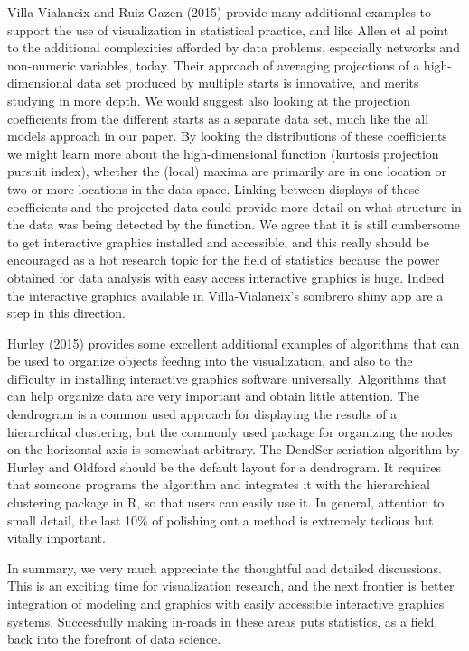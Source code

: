 \documentclass[preprint]{imsart}
\begin{document}
Villa-Vialaneix and Ruiz-Gazen (2015) provide many additional examples to support the use of visualization in statistical practice, and like Allen et al point to the additional complexities afforded by data problems, especially networks and non-numeric variables, today. Their approach of averaging projections of a high-dimensional data set produced by multiple starts is innovative, and merits studying in more depth. We would suggest also looking at the projection coefficients from the different starts as a separate data set, much like the all models approach in our paper. By looking the distributions of these coefficients we might learn more about the high-dimensional function (kurtosis projection pursuit index), whether the (local) maxima are primarily are in one location or two or more locations in the data space. Linking between displays of these coefficients and the projected data could provide more detail on what structure in the data was being detected by the function. We agree that it is still cumbersome to get interactive graphics installed and accessible, and this really should be encouraged as a hot research topic for the field of statistics because the power obtained  for data analysis with easy access interactive graphics is huge. Indeed the interactive graphics available in Villa-Vialaneix's sombrero shiny app are a step in this direction.

Hurley (2015) provides some excellent additional examples of algorithms that can be used to organize objects feeding into the visualization, and also to the difficulty in installing interactive graphics software universally. Algorithms that can help organize data are very important and obtain little attention. The dendrogram is a common used approach for displaying the results of a hierarchical clustering, but the commonly used package for organizing the nodes on the horizontal axis is somewhat arbitrary. The DendSer seriation algorithm by Hurley and Oldford should be the default layout for a dendrogram. It requires that someone programs the algorithm and integrates it with the hierarchical clustering package in R, so that users can easily use it. In general, attention to small detail, the last 10\% of polishing out a method is extremely tedious but vitally important. 

In summary, we very much appreciate the thoughtful and detailed discussions. This is an exciting time for visualization research, and the next frontier is better integration of modeling and graphics with easily accessible interactive graphics systems. Successfully making in-roads in these areas puts statistics, as a field, back into the forefront of data science. 



\end{document}
